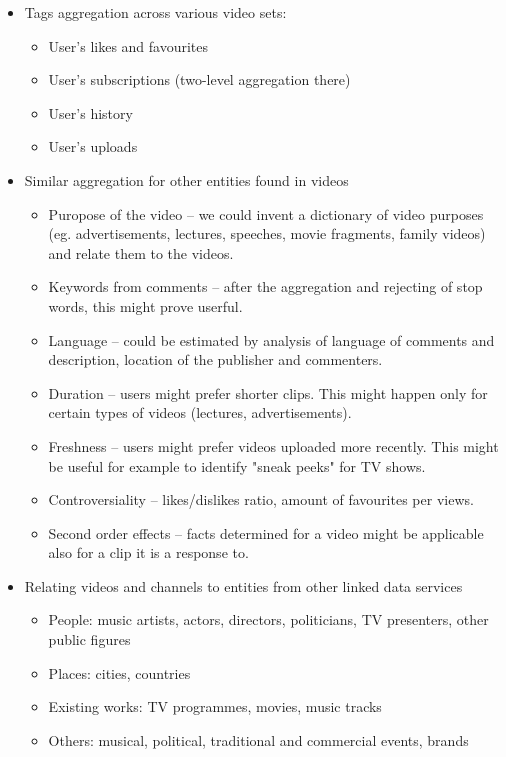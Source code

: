 \documentclass{article}
\begin{document}
\begin{itemize}
\item{Tags aggregation across various video sets:
\begin{itemize}
  \item{User's likes and favourites}
  \item{User's subscriptions (two-level aggregation there)}
  \item{User's history}
  \item{User's uploads}
\end{itemize}
}

\item{Similar aggregation for other entities found in videos
\begin{itemize}
  \item{Puropose of the video -- we could invent a dictionary of video purposes
  (eg. advertisements, lectures, speeches, movie fragments, family videos) and
  relate them to the videos.}
  \item{Keywords from comments -- after the aggregation and rejecting of stop
  words, this might prove userful.}
  \item{Language -- could be estimated by analysis of language of
  comments and description, location of the publisher and commenters.}
  \item{Duration -- users might prefer shorter clips. This might happen only for
  certain types of videos (lectures, advertisements).}
  \item{Freshness -- users might prefer videos uploaded more recently. This
  might be useful for example to identify "sneak peeks" for TV shows.}
  \item{Controversiality -- likes/dislikes ratio, amount of favourites per
  views.}
  \item{Second order effects -- facts determined for a video might be applicable
  also for a clip it is a response to.}
\end{itemize}
}

\item{Relating videos and channels to entities from other linked data services
\begin{itemize}
  \item{People: music artists, actors, directors, politicians, TV presenters,
  other public figures}
  \item{Places: cities, countries}
  \item{Existing works: TV programmes, movies, music tracks}
  \item{Others: musical, political, traditional and commercial events, brands}
\end{itemize}
}
\end{itemize}
\end{document}
